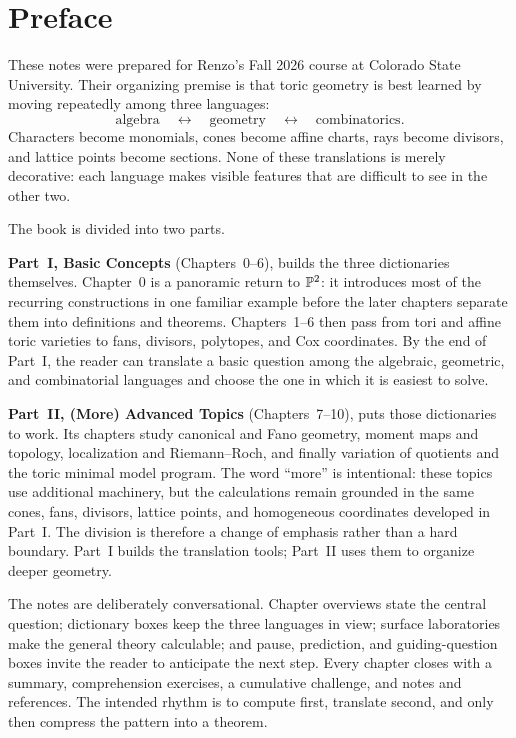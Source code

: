 \chapter*{Preface}

These notes were prepared for Renzo's Fall 2026 course at Colorado
State University. Their organizing premise is that toric geometry is
best learned by moving repeatedly among three languages:
\[
\boxed{
\text{algebra}
\quad\longleftrightarrow\quad
\text{geometry}
\quad\longleftrightarrow\quad
\text{combinatorics}.
}
\]
Characters become monomials, cones become affine charts, rays become
divisors, and lattice points become sections. None of these
translations is merely decorative: each language makes visible
features that are difficult to see in the other two.

The book is divided into two parts.

\textbf{Part~I, Basic Concepts}
(Chapters~0--6), builds the three dictionaries themselves. Chapter~0 is
a panoramic return to \(\mathbb{P}^2\): it introduces most of the recurring
constructions in one familiar example before the later chapters separate
them into definitions and theorems. Chapters~1--6 then pass from tori and
affine toric varieties to fans, divisors, polytopes, and Cox coordinates.
By the end of Part~I, the reader can translate a basic question among the
algebraic, geometric, and combinatorial languages and choose the one in
which it is easiest to solve.

\textbf{Part~II, (More) Advanced Topics} (Chapters~7--10), puts those
dictionaries to work. Its chapters study canonical and Fano geometry,
moment maps and topology, localization and Riemann--Roch, and finally
variation of quotients and the toric minimal model program. The word
``more'' is intentional: these topics use additional machinery, but the
calculations remain grounded in the same cones, fans, divisors, lattice
points, and homogeneous coordinates developed in Part~I. The division is
therefore a change of emphasis rather than a hard boundary. Part~I builds
the translation tools; Part~II uses them to organize deeper geometry.

The notes are deliberately conversational. Chapter overviews state
the central question; dictionary boxes keep the three languages in
view; surface laboratories make the general theory calculable; and
pause, prediction, and guiding-question boxes invite the reader to
anticipate the next step. Every chapter closes with a summary,
comprehension exercises, a cumulative challenge, and notes and
references. The intended rhythm is to compute first, translate
second, and only then compress the pattern into a theorem.


